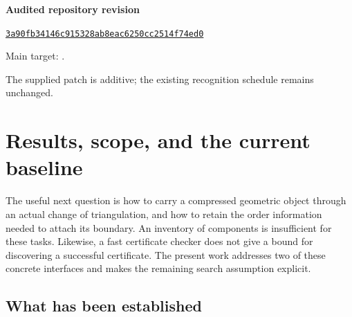 \documentclass[11pt,letterpaper]{article}
\theoremstyle{definition}
\theoremstyle{remark}
\begin{document}
\begin{titlepage}
\begin{abstract}
The implementation includes separate certificate consumers, source-bound
unknot witnesses, literal and Regina comparisons, adversarial tests, and
paired performance experiments. The local results advance retriangulation
and attachment handling. They do not bound the number of geometric escapes
needed for arbitrary diagrams, nor supply the complete three-dimensional
cutting compiler required by a general quasi-polynomial recognizer.
\end{abstract}
\vfill
\noindent\small\textbf{Audited repository revision}\par
\noindent\small\href{https://github.com/VladimirReshetnikov/ProveIt/commit/3a90fb34146c915328ab8eac6250cc2514f74ed0}{\texttt{3a90fb34146c915328ab8eac6250cc2514f74ed0}}\par
\noindent\small Main target: .\par
\noindent\small The supplied patch is additive; the existing recognition schedule remains unchanged.
\end{titlepage}

\hypersetup{pageanchor=true}
\tableofcontents
\clearpage
{}

\section{Results, scope, and the current baseline}

The useful next question is how to carry a compressed geometric object
through an actual change of triangulation, and how to retain the order
information needed to attach its boundary. An inventory of components is
insufficient for these tasks. Likewise, a fast certificate checker does not
give a bound for discovering a successful certificate. The present work
addresses two of these concrete interfaces and makes the remaining search
assumption explicit.

\subsection{What has been established}
\end{document}
